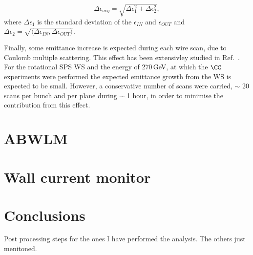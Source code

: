 \begin{equation}\label{eq:avg+emittance_from_WS_uncertainty}
   \Delta \epsilon_{avg} = \sqrt{\Delta \epsilon_1 ^2 + \Delta \epsilon_2 ^2},
\end{equation}
where $\Delta \epsilon_1$ is the standard deviation of the $\epsilon_{IN}$ and $\epsilon_{OUT}$ and $\Delta \epsilon_2=\sqrt{\langle \Delta \epsilon_{IN}, \Delta \epsilon_{OUT}\rangle}$.


Finally, some emittance increase is expected during each wire scan, due to Coulomb multiple scattering. This effect has been extensivley studied in Ref.~\cite{Roncarolo:1481835}. For the rotational SPS WS and the energy of 270\,GeV, at which the $\CC$ experiments were performed the expected emittance growth from the WS is expected to be small. However, a conservative number of scans were carried, $\sim$ 20 scans per bunch and per plane during $\sim$ 1 hour, in order to minimise the contribution from this effect.

\section{ABWLM}\label{sec:ABWLM}

\section{Wall current monitor}\label{sec:WallCurrentMonitor}

\section{Conclusions}

Post processing steps for the ones I have performed the analysis. The others just menitoned.

